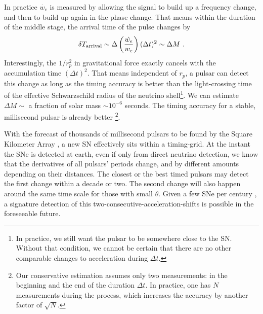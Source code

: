\documentclass[aps,showpacs,twocolumn,floats,prd,superscriptaddress,nofootinbib]{revtex4}
\begin{document}
In practice $\dot{w_e}$ is measured by allowing the signal to build up a frequency change, and then to build up again in the phase change. That means within the duration of the middle stage, the arrival time of the pulse changes by 
\begin{equation}
\delta T_{\rm arrival} \sim \Delta\left(\frac{\dot{w_e}}{w_e}\right)(\Delta t)^2
\sim \Delta M~.
\end{equation}
Interestingly, the $1/r_p^2$ in gravitational force exactly cancels with the accumulation time $(\Delta t)^2$. That means independent of $r_p$, a pulsar can detect this change as long as the timing accuracy is better than the light-crossing time of the effective Schwarzschild radius of the neutrino shell\footnote{In practice, we still want the pulsar to be somewhere close to the SN. Without that condition, we cannot be certain that there are no other comparable changes to acceleration during $\Delta t$.}. We can estimate $\Delta M\sim$ a fraction of solar mass $\sim10^{-6}$ seconds. The timing accuracy for a stable, millisecond pulsar is already better \cite{PulsarTiming}\footnote{Our conservative estimation assumes only two measurements: in the beginning and the end of the duration $\Delta t$. In practice, one has $N$ measurements during the process, which increases the accuracy by another factor of $\sqrt{N}$.}.

With the forecast of thousands of millisecond pulsars to be found by the Square Kilometer Array \cite{SKA}, a new SN effectively sits within a timing-grid. At the instant the SNe is detected at earth, even if only from direct neutrino detection, we know that the derivatives of all pulsars' periods change, and by different amounts depending on their distances. The closest or the best timed pulsars may detect the first change within a decade or two. The second change will also happen around the same time scale for those with small $\theta$. Given a few SNe per century \cite{SNrate06}, a signature detection of this two-consecutive-acceleration-shifts is possible in the foreseeable future.

\end{document}
